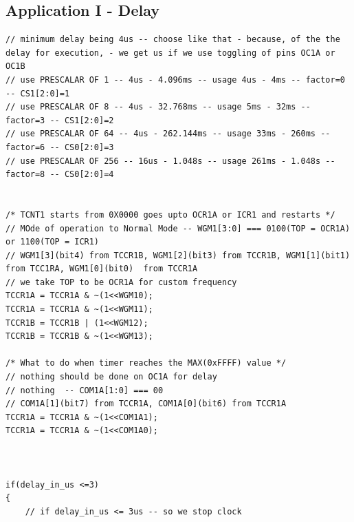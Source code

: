 \documentclass{article}
\begin{document}
\subsection{Application I - Delay}
\begin{verbatim}
// minimum delay being 4us -- choose like that - because, of the the delay for execution, - we get us if we use toggling of pins OC1A or OC1B
// use PRESCALAR OF 1 -- 4us - 4.096ms -- usage 4us - 4ms -- factor=0 -- CS1[2:0]=1
// use PRESCALAR OF 8 -- 4us - 32.768ms -- usage 5ms - 32ms -- factor=3 -- CS1[2:0]=2
// use PRESCALAR OF 64 -- 4us - 262.144ms -- usage 33ms - 260ms -- factor=6 -- CS0[2:0]=3
// use PRESCALAR OF 256 -- 16us - 1.048s -- usage 261ms - 1.048s -- factor=8 -- CS0[2:0]=4


/* TCNT1 starts from 0X0000 goes upto OCR1A or ICR1 and restarts */	
// MOde of operation to Normal Mode -- WGM1[3:0] === 0100(TOP = OCR1A) or 1100(TOP = ICR1)
// WGM1[3](bit4) from TCCR1B, WGM1[2](bit3) from TCCR1B, WGM1[1](bit1)  from TCC1RA, WGM1[0](bit0)  from TCCR1A	
// we take TOP to be OCR1A for custom frequency
TCCR1A = TCCR1A & ~(1<<WGM10);
TCCR1A = TCCR1A & ~(1<<WGM11);
TCCR1B = TCCR1B | (1<<WGM12);
TCCR1B = TCCR1B & ~(1<<WGM13);
    
/* What to do when timer reaches the MAX(0xFFFF) value */
// nothing should be done on OC1A for delay
// nothing  -- COM1A[1:0] === 00
// COM1A[1](bit7) from TCCR1A, COM1A[0](bit6) from TCCR1A
TCCR1A = TCCR1A & ~(1<<COM1A1);
TCCR1A = TCCR1A & ~(1<<COM1A0);



if(delay_in_us <=3)
{
    // if delay_in_us <= 3us -- so we stop clock
    

\end{verbatim}
\end{document}
